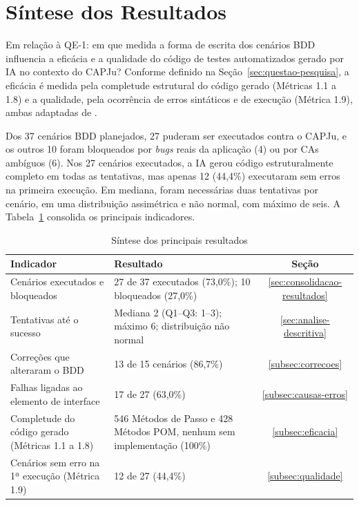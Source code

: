 \section{Síntese dos Resultados}
\label{sec:sintese-resultados}

Em relação à QE-1: em que medida a forma de escrita dos cenários BDD influencia a eficácia e a qualidade do código de testes automatizados gerado por IA no contexto do CAPJu? Conforme definido na Seção~\ref{sec:questao-pesquisa}, a eficácia é medida pela completude estrutural do código gerado (Métricas 1.1 a 1.8) e a qualidade, pela ocorrência de erros sintáticos e de execução (Métrica 1.9), ambas adaptadas de .

Dos 37 cenários BDD planejados, 27 puderam ser executados contra o CAPJu, e os outros 10 foram bloqueados por \textit{bugs} reais da aplicação (4) ou por CAs ambíguos (6). Nos 27 cenários executados, a IA gerou código estruturalmente completo em todas as tentativas, mas apenas 12 (44,4\%) executaram sem erros na primeira execução. Em mediana, foram necessárias duas tentativas por cenário, em uma distribuição assimétrica e não normal, com máximo de seis. A Tabela~\ref{tab:sintese} consolida os principais indicadores.

\begin{table}[htb]
\centering
\caption{Síntese dos principais resultados}
\label{tab:sintese}
\begin{tabular}{p{5.0cm}p{7.6cm}c}
\hline
\textbf{Indicador} & \textbf{Resultado} & \textbf{Seção} \\
\hline
Cenários executados e bloqueados & 27 de 37 executados (73,0\%); 10 bloqueados (27,0\%) & \ref{sec:consolidacao-resultados} \\
Tentativas até o sucesso & Mediana 2 (Q1--Q3: 1--3); máximo 6; distribuição não normal & \ref{sec:analise-descritiva} \\
Correções que alteraram o BDD & 13 de 15 cenários (86,7\%) & \ref{subsec:correcoes} \\
Falhas ligadas ao elemento de interface & 17 de 27 (63,0\%) & \ref{subsec:causas-erros} \\
Completude do código gerado (Métricas 1.1 a 1.8) & 546 Métodos de Passo e 428 Métodos POM, nenhum sem implementação (100\%) & \ref{subsec:eficacia} \\
Cenários sem erro na 1ª execução (Métrica 1.9) & 12 de 27 (44,4\%) & \ref{subsec:qualidade} \\
\hline
\end{tabular}
\end{table}

